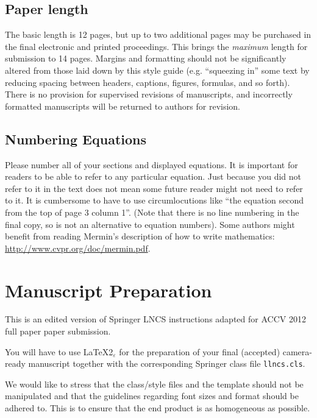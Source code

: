 \documentclass[runningheads]{llncs}
\begin{document}
\subsection{Paper length}

The basic length is 12 pages, but up to two additional pages may be
purchased in the final electronic and printed proceedings. This brings the {\em
maximum} length for submission to 14 pages. Margins and
formatting should not be significantly altered from those
laid down by this style guide (e.g. ``squeezing in'' some text by reducing
spacing between headers, captions, figures, formulas, and so forth).  There is no
provision for supervised revisions of manuscripts, and incorrectly
formatted manuscripts will be returned to authors for revision.

\subsection{Numbering Equations}

Please number all of your sections and displayed equations.  It is
important for readers to be able to refer
to any particular equation.  Just because you did not refer to it in
the text does not mean some future reader might not need to refer to
it.  It is cumbersome to have to use circumlocutions like ``the
equation second from the top of page 3 column 1''.  (Note that there
is no line numbering in the final copy, so is not an
alternative to equation numbers).  Some authors might benefit from
reading Mermin's description of how to write mathematics:
\url{http://www.cvpr.org/doc/mermin.pdf}.

\section{Manuscript Preparation}

This is an edited version of Springer LNCS instructions adapted for
ACCV 2012 full paper paper submission.

You will have to use \LaTeX2$_\varepsilon$ for the
preparation of your final (accepted)
camera-ready manuscript together with the corresponding Springer
class file \verb+llncs.cls+.

We would like to stress that the class/style files and the template
should not be manipulated and that the guidelines regarding font sizes
and format should be adhered to. This is to ensure that the end product
is as homogeneous as possible.
\end{document}
